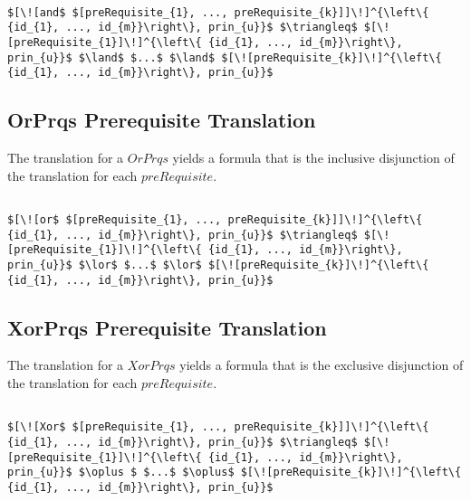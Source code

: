 \lstset{mathescape, language=AST}  
\begin{lstlisting}[frame=single, caption={Prerequisite Translation {$\colon$} Conjunction },label={lst:transpreRequisiteAndPrqs}]

$[\![and$ $[preRequisite_{1}, ..., preRequisite_{k}]]\!]^{\left\{ {id_{1}, ..., id_{m}}\right\}, prin_{u}}$ $\triangleq$ $[\![preRequisite_{1}]\!]^{\left\{ {id_{1}, ..., id_{m}}\right\}, prin_{u}}$ $\land$ $...$ $\land$ $[\![preRequisite_{k}]\!]^{\left\{ {id_{1}, ..., id_{m}}\right\}, prin_{u}}$

\end{lstlisting}

\subsection{OrPrqs Prerequisite Translation}
The translation for a $OrPrqs$ yields a formula that is the inclusive disjunction of the translation for each $preRequisite$.

\lstset{mathescape, language=AST}  
\begin{lstlisting}[frame=single, caption={Prerequisite Translation {$\colon$} Inclusive Disjunction},label={lst:transpreRequisiteOrPrqs}]

$[\![or$ $[preRequisite_{1}, ..., preRequisite_{k}]]\!]^{\left\{ {id_{1}, ..., id_{m}}\right\}, prin_{u}}$ $\triangleq$ $[\![preRequisite_{1}]\!]^{\left\{ {id_{1}, ..., id_{m}}\right\}, prin_{u}}$ $\lor$ $...$ $\lor$ $[\![preRequisite_{k}]\!]^{\left\{ {id_{1}, ..., id_{m}}\right\}, prin_{u}}$

\end{lstlisting}

\subsection{XorPrqs Prerequisite Translation}
The translation for a $XorPrqs$ yields a formula that is the exclusive disjunction of the translation for each $preRequisite$.


\lstset{mathescape, language=AST}  
\begin{lstlisting}[frame=single, caption={Prerequisite Translation {$\colon$} Exclusive Disjunction},label={lst:transpreRequisiteXorPrqs}]

$[\![Xor$ $[preRequisite_{1}, ..., preRequisite_{k}]]\!]^{\left\{ {id_{1}, ..., id_{m}}\right\}, prin_{u}}$ $\triangleq$ $[\![preRequisite_{1}]\!]^{\left\{ {id_{1}, ..., id_{m}}\right\}, prin_{u}}$ $\oplus $ $...$ $\oplus$ $[\![preRequisite_{k}]\!]^{\left\{ {id_{1}, ..., id_{m}}\right\}, prin_{u}}$

\end{lstlisting}


